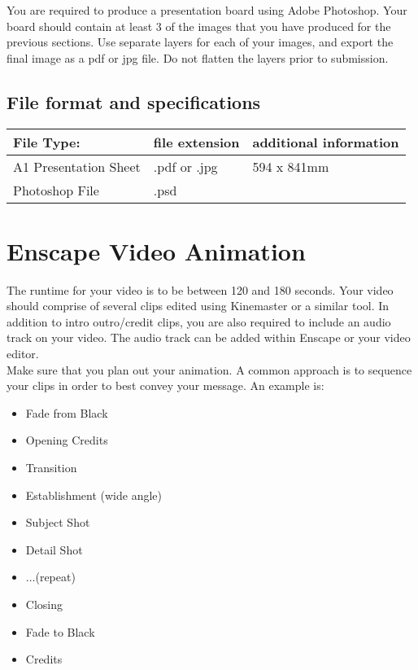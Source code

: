 You are required to produce a presentation board using Adobe Photoshop.  Your board should contain at least 3 of the images that you have produced for the previous sections.  Use separate layers for each of your images, and export the final image as a pdf or jpg file.  Do not flatten the layers prior to submission.

\subsection*{File format and specifications}

\begin{tabularx}{\textwidth}{ |X|X|X| }
	\hline
	\textbf{File Type:} & file extension & additional information\\
	\hline 
	A1 Presentation Sheet  & .pdf or .jpg & 594 x 841mm\\
	Photoshop File & .psd & \\
	\hline
\end{tabularx}



\section*{Enscape Video Animation}

The runtime for your video is to be between 120 and 180 seconds.  Your video should comprise of several clips edited using Kinemaster or a similar tool.  In addition to intro outro/credit clips, you are also required to include an audio track on your video. The audio track can be added within Enscape or your video editor. \\

Make sure that you plan out your animation. A common approach is to sequence your clips in order to best convey your message.  An example is:

\begin{itemize}
	\item Fade from Black
	\item Opening Credits
	\item Transition
	\item Establishment (wide angle)
	\item Subject Shot 
	\item Detail Shot
	\item ...(repeat)
	\item Closing 
	\item Fade to Black
	\item Credits
\end{itemize}


